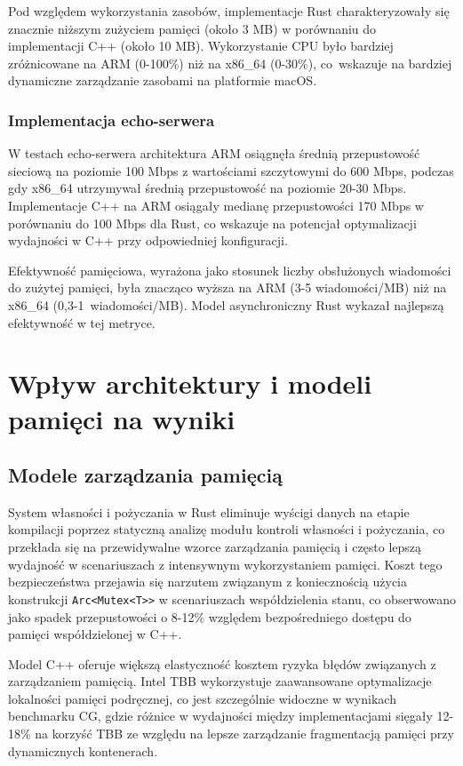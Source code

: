 Pod względem wykorzystania zasobów, implementacje Rust charakteryzowały się znacznie niższym zużyciem pamięci (około 3 MB) w porównaniu do implementacji C++ (około 10 MB). Wykorzystanie CPU było bardziej zróżnicowane na ARM (0-100\%) niż na x86\_64 (0-30\%), co~wskazuje na bardziej dynamiczne zarządzanie zasobami na platformie macOS.

\subsubsection{Implementacja echo-serwera}

W testach echo-serwera architektura ARM osiągnęła średnią przepustowość sieciową na poziomie 100 Mbps z wartościami szczytowymi do 600 Mbps, podczas gdy x86\_64 utrzymywał średnią przepustowość na poziomie 20-30 Mbps. Implementacje C++ na ARM osiągały medianę przepustowości 170 Mbps w porównaniu do 100 Mbps dla Rust, co wskazuje na potencjał optymalizacji wydajności w C++ przy odpowiedniej konfiguracji.

Efektywność pamięciowa, wyrażona jako stosunek liczby obsłużonych wiadomości do zużytej pamięci, była znacząco wyższa na ARM (3-5 wiadomości/MB) niż na x86\_64 \mbox{(0,3-1 wiadomości/MB)}. Model asynchroniczny Rust wykazał najlepszą efektywność w tej metryce.

\section{Wpływ architektury i modeli pamięci na wyniki}

\subsection{Modele zarządzania pamięcią}

System własności i pożyczania w Rust eliminuje wyścigi danych na etapie kompilacji poprzez statyczną analizę modułu kontroli własności i pożyczania, co przekłada się na przewidywalne wzorce zarządzania pamięcią i często lepszą wydajność w scenariuszach z intensywnym wykorzystaniem pamięci. Koszt tego bezpieczeństwa przejawia się narzutem związanym z koniecznością użycia konstrukcji \texttt{Arc<Mutex<T>>} w scenariuszach współdzielenia stanu, co obserwowano jako spadek przepustowości o 8-12\% względem bezpośredniego dostępu do pamięci współdzielonej w C++.

Model C++ oferuje większą elastyczność kosztem ryzyka błędów związanych z zarządzaniem pamięcią. Intel TBB wykorzystuje zaawansowane optymalizacje lokalności pamięci podręcznej, co jest szczególnie widoczne w wynikach benchmarku CG, gdzie różnice w wydajności między implementacjami sięgały 12-18\% na korzyść TBB ze względu na lepsze zarządzanie fragmentacją pamięci przy dynamicznych kontenerach.

